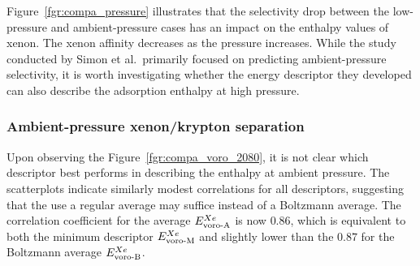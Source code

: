 \documentclass[main]{subfiles}
\begin{document}
Figure~\ref{fgr:compa_pressure} illustrates that the selectivity drop between the low-pressure and ambient-pressure cases has an impact on the enthalpy values of xenon. The xenon affinity decreases as the pressure increases. While the study conducted by Simon et al.\ primarily focused on predicting ambient-pressure selectivity, it is worth investigating whether the energy descriptor they developed can also describe the adsorption enthalpy at high pressure.

\subsubsection{Ambient-pressure xenon/krypton separation}

Upon observing the Figure~\ref{fgr:compa_voro_2080}, it is not clear which descriptor best performs in describing the enthalpy at ambient pressure. The scatterplots indicate similarly modest correlations for all descriptors, suggesting that the use a regular average may suffice instead of a Boltzmann average. The correlation coefficient for the average $E_{\text{voro-A}}^{Xe}$ is now $0.86$, which is equivalent to both the minimum descriptor $E_{\text{voro-M}}^{Xe}$ and slightly lower than the $0.87$ for the Boltzmann average $E_{\text{voro-B}}^{Xe}$. 
\end{document}
